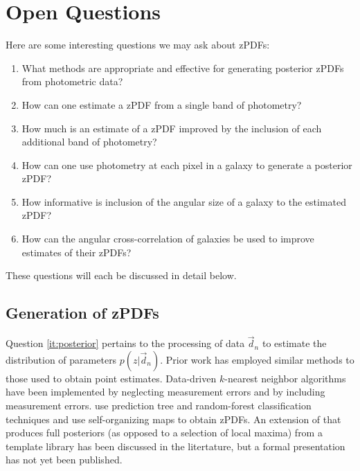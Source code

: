 \documentclass[12pt, onecolumn]{emulateapj}
\begin{document}
\section{Open Questions}

Here are some interesting questions we may ask about zPDFs:

\begin{enumerate}
\item \label{it:posterior} What methods are appropriate and effective for generating posterior zPDFs from photometric data?
\item \label{it:single} How can one estimate a zPDF from a single band of photometry?
\item \label{it:plus} How much is an estimate of a zPDF improved by the inclusion of each additional band of photometry? 
\item \label{it:pixel} How can one use photometry at each pixel in a galaxy to generate a posterior zPDF?
\item \label{it:spatial} How informative is inclusion of the angular size of a galaxy to the estimated zPDF?
\item \label{it:position} How can the angular cross-correlation of galaxies be used to improve estimates of their zPDFs?
\end{enumerate}

These questions will each be discussed in detail below.

\subsection{Generation of zPDFs}

Question \ref{it:posterior} pertains to the processing of data $\vec{d}_{n}$ to estimate the distribution of parameters $p(z|\vec{d}_{n})$.  Prior work has employed similar methods to those used to obtain point estimates. Data-driven $k$-nearest neighbor algorithms have been implemented by \citet{she11} neglecting measurement errors and by \citet{bal08} including measurement errors.  \citet{car13} use prediction tree and random-forest classification techniques and \citet{car14} use self-organizing maps  to obtain zPDFs.  An extension of \citet{ben00} that produces full posteriors (as opposed to a selection of local maxima) from a template library has been discussed in the litertature, but a formal presentation has not yet been published.
\end{document}
